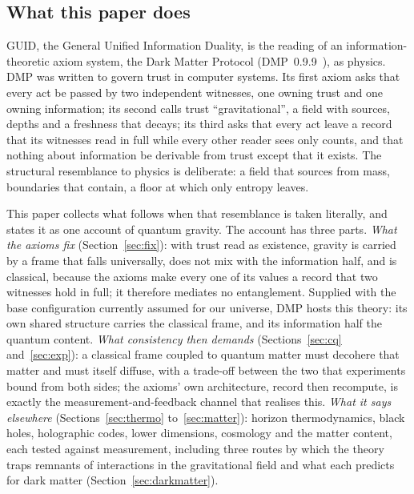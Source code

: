 \documentclass[11pt,a4paper]{article}
\theoremstyle{definition}
\theoremstyle{remark}
\theoremstyle{definition}
\begin{document}
\subsection{What this paper does}

GUID, the General Unified Information Duality, is the reading of an information-theoretic axiom system, the Dark Matter Protocol
(DMP~0.9.9~\cite{dmp}), as physics. DMP was written to govern trust in computer systems. Its first axiom asks that every act be passed by two
independent witnesses, one owning trust and one owning information; its second calls trust ``gravitational'', a field with sources,
depths and a freshness that decays; its third asks that every act leave a record that its witnesses read in full while every other reader
sees only counts, and that nothing about information be derivable from trust except that it exists. The structural resemblance to physics
is deliberate: a field that sources from mass, boundaries that contain, a floor at which only entropy leaves.

This paper collects what follows when that resemblance is taken literally, and states it as one account of quantum gravity. The account
has three parts. \emph{What the axioms fix} (Section~\ref{sec:fix}): with trust read as existence, gravity is carried by a frame that falls
universally, does not mix with the information half, and is classical, because the axioms make every one of its values a record that two
witnesses hold in full; it therefore mediates no entanglement. Supplied with the base configuration currently assumed for our universe,
DMP hosts this theory: its own shared structure carries the classical frame, and its information half the quantum content. \emph{What consistency then demands} (Sections~\ref{sec:cq} and~\ref{sec:exp}): a classical frame coupled to quantum matter must
decohere that matter and must itself diffuse, with a trade-off between the two that experiments bound from both sides; the axioms' own
architecture, record then recompute, is exactly the measurement-and-feedback channel that realises this. \emph{What it says elsewhere}
(Sections~\ref{sec:thermo} to~\ref{sec:matter}): horizon thermodynamics, black holes, holographic codes, lower dimensions, cosmology and
the matter content, each tested against measurement, including three routes by which the theory traps remnants of interactions in the
gravitational field and what each predicts for dark matter (Section~\ref{sec:darkmatter}).
\end{document}
